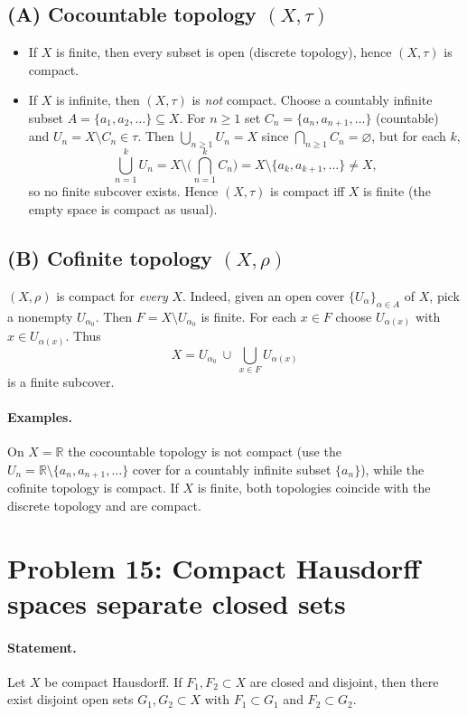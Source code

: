 \documentclass[12pt,a4paper]{article}
\theoremstyle{plain}
\theoremstyle{definition}
\theoremstyle{remark}
\theoremstyle{remark}
\begin{document}
	\subsection*{(A) Cocountable topology $(X,\tau)$}
	\begin{itemize}
		\item If $X$ is finite, then every subset is open (discrete topology), hence $(X,\tau)$ is compact.
		\item If $X$ is infinite, then $(X,\tau)$ is \emph{not} compact.  
		Choose a countably infinite subset $A=\{a_1,a_2,\dots\}\subseteq X$.  
		For $n\ge1$ set $C_n=\{a_n,a_{n+1},\dots\}$ (countable) and $U_n=X\setminus C_n\in\tau$.
		Then $\bigcup_{n\ge1}U_n=X$ since $\bigcap_{n\ge1} C_n=\varnothing$, but for each $k$,
		\[
		\bigcup_{n=1}^k U_n=X\setminus\Big(\bigcap_{n=1}^k C_n\Big)=X\setminus\{a_k,a_{k+1},\dots\}\neq X,
		\]
		so no finite subcover exists. Hence $(X,\tau)$ is compact iff $X$ is finite (the empty space is compact as usual).
	\end{itemize}
	
	\subsection*{(B) Cofinite topology $(X,\rho)$}
	$(X,\rho)$ is compact for \emph{every} $X$.  
	Indeed, given an open cover $\{U_\alpha\}_{\alpha\in A}$ of $X$, pick a nonempty $U_{\alpha_0}$.
	Then $F=X\setminus U_{\alpha_0}$ is finite. For each $x\in F$ choose $U_{\alpha(x)}$ with $x\in U_{\alpha(x)}$.
	Thus
	\[
	X=U_{\alpha_0}\ \cup\ \bigcup_{x\in F} U_{\alpha(x)}
	\]
	is a finite subcover.
	
	\paragraph{Examples.}
	On $X=\mathbb{R}$ the cocountable topology is not compact (use the $U_n=\mathbb{R}\setminus\{a_n,a_{n+1},\dots\}$ cover for a countably infinite subset $\{a_n\}$), while the cofinite topology is compact. If $X$ is finite, both topologies coincide with the discrete topology and are compact.
	
	\section*{Problem 15: Compact Hausdorff spaces separate closed sets}
	
	\paragraph{Statement.}
	Let $X$ be compact Hausdorff. If $F_1,F_2\subset X$ are closed and disjoint, then there exist disjoint open sets $G_1,G_2\subset X$ with $F_1\subset G_1$ and $F_2\subset G_2$.
	
\end{document}
